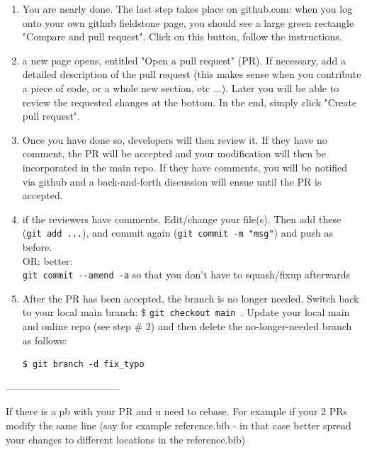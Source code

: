 \begin{enumerate}
\item You are nearly done. The last step takes place on github.com: when you log onto 
your own github fieldstone page, you should see a large green rectangle "Compare and pull request".
Click on this button, follow the instructions.

\item a new page opens, entitled "Open a pull request" (PR). If necessary, add a detailed description of 
the pull request (this makes sense when you contribute a piece of code, or a whole new section, etc ...).
Later you will be able to review the requested changes at the bottom. In the end, simply click "Create pull request".

\item Once you have done so, \aspect developers will then review it. 
If they have no comment, the PR will be accepted and your modification will 
then be incorporated in the main repo. If they have comments, you will be notified via github and a 
back-and-forth discussion will ensue until the PR is accepted. 

\item if the reviewers have comments. Edit/change your file(s). 
Then add these (\verb'git add ...'), and commit again (\verb'git commit -m "msg"')
and push as before. \\
OR: better: \\
\verb'git commit --amend -a' so that you don't have to squash/fixup afterwards



\item After the PR has been accepted, the branch is no longer needed. Switch back to your local main branch:
\$ \verb"git checkout main ".
Update your local main and online repo (see step \# 2) and then delete the no-longer-needed 
branch as follows:
\begin{verbatim}
$ git branch -d fix_typo
\end{verbatim}
\end{enumerate}

-----------------------------------

If there is a pb with your PR and u need to rebase. For example if your 2 PRs modify the same line (say for example reference.bib - 
in that case better spread your changes to different locations in the reference.bib)

